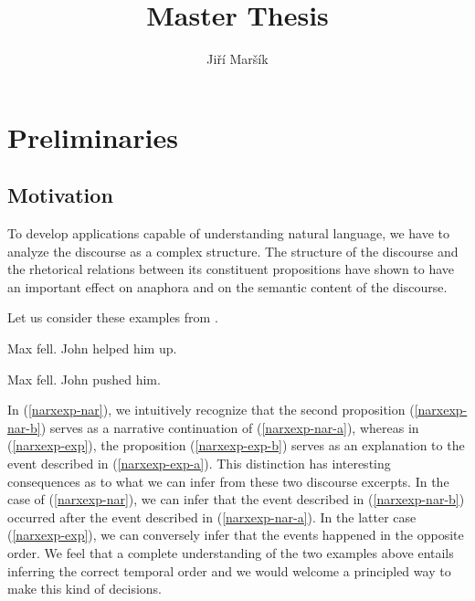 \documentclass{article}
\begin{document}
\author{Ji\v{r}\'{i} Mar\v{s}\'{i}k}
\title{Master Thesis}
\maketitle

\section{Preliminaries}

\subsection{Motivation}

To develop applications capable of understanding natural language, we
have to analyze the discourse as a complex structure. The structure of
the discourse and the rhetorical relations between its constituent
propositions have shown to have an important effect on anaphora and on
the semantic content of the discourse.

Let us consider these examples from \cite{asher2003logics}.

\begin{exe}
  \ex \label{narxexp-nar} \begin{xlist}
    \ex \label{narxexp-nar-a} Max fell.
    \ex \label{narxexp-nar-b} John helped him up.
  \end{xlist}
  \ex \label{narxexp-exp} \begin{xlist}
    \ex \label{narxexp-exp-a} Max fell.
    \ex \label{narxexp-exp-b} John pushed him.
  \end{xlist}
\end{exe}

In (\ref{narxexp-nar}), we intuitively recognize that the second
proposition (\ref{narxexp-nar-b}) serves as a narrative continuation of
(\ref{narxexp-nar-a}), whereas in (\ref{narxexp-exp}), the proposition
(\ref{narxexp-exp-b}) serves as an explanation to the event described in
(\ref{narxexp-exp-a}). This distinction has interesting consequences as
to what we can infer from these two discourse excerpts. In the case of
(\ref{narxexp-nar}), we can infer that the event described in
(\ref{narxexp-nar-b}) occurred after the event described in
(\ref{narxexp-nar-a}). In the latter case (\ref{narxexp-exp}), we can
conversely infer that the events happened in the opposite order. We feel
that a complete understanding of the two examples above entails
inferring the correct temporal order and we would welcome a principled
way to make this kind of decisions.
\end{document}
